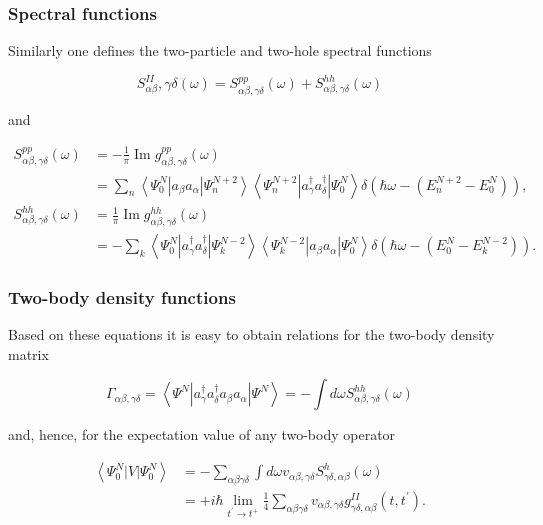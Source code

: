 \documentclass[compress]{beamer}
\begin{document}
{
\frametitle{Spectral functions}
\begin{small}
{\scriptsize
Similarly one defines the two-particle and two-hole spectral functions

$$
S_{\alpha \beta}^{I I}, \gamma \delta(\omega)=S_{\alpha \beta, \gamma \delta}^{p p}(\omega)+S_{\alpha \beta, \gamma \delta}^{h h}(\omega)
$$

and

$$
\begin{aligned}
S_{\alpha \beta, \gamma \delta}^{p p}(\omega) & =-\frac{1}{\pi} \operatorname{Im} g_{\alpha \beta, \gamma \delta}^{p p}(\omega) \\
& =\sum_{n}\left\langle\Psi_{0}^{N}\left|a_{\beta} a_{\alpha}\right| \Psi_{n}^{N+2}\right\rangle\left\langle\Psi_{n}^{N+2}\left|a_{\gamma}^{\dagger} a_{\delta}^{\dagger}\right| \Psi_{0}^{N}\right\rangle \delta\left(\hbar \omega-\left(E_{n}^{N+2}-E_{0}^{N}\right)\right), \\
S_{\alpha \beta, \gamma \delta}^{h h}(\omega) & =\frac{1}{\pi} \operatorname{Im} g_{\alpha \beta, \gamma \delta}^{h h}(\omega) \\
& =-\sum_{k}\left\langle\Psi_{0}^{N}\left|a_{\gamma}^{\dagger} a_{\delta}^{\dagger}\right| \Psi_{k}^{N-2}\right\rangle\left\langle\Psi_{k}^{N-2}\left|a_{\beta} a_{\alpha}\right| \Psi_{0}^{N}\right\rangle \delta\left(\hbar \omega-\left(E_{0}^{N}-E_{k}^{N-2}\right)\right) .
\end{aligned}
$$

}
\end{small}
}
\frame
{
\frametitle{Two-body density functions}
\begin{small}
{\scriptsize
Based on these equations it is easy to obtain relations for the two-body density matrix

$$
\Gamma_{\alpha \beta, \gamma \delta}=\left\langle\Psi^{N}\left|a_{\gamma}^{\dagger} a_{\delta}^{\dagger} a_{\beta} a_{\alpha}\right| \Psi^{N}\right\rangle=-\int d \omega S_{\alpha \beta, \gamma \delta}^{h h}(\omega)
$$

and, hence, for the expectation value of any two-body operator

$$
\begin{aligned}
\left\langle\Psi_{0}^{N}|V| \Psi_{0}^{N}\right\rangle & =-\sum_{\alpha \beta \gamma \delta} \int d \omega v_{\alpha \beta, \gamma \delta} S_{\gamma \delta, \alpha \beta}^{h}(\omega) \\
& =+i \hbar \lim _{t^{\prime} \rightarrow t^{+}} \frac{1}{4} \sum_{\alpha \beta \gamma \delta} v_{\alpha \beta, \gamma \delta} g_{\gamma \delta, \alpha \beta}^{I I}\left(t, t^{\prime}\right) .
\end{aligned}
$$

}
\end{small}
}
\end{document}
